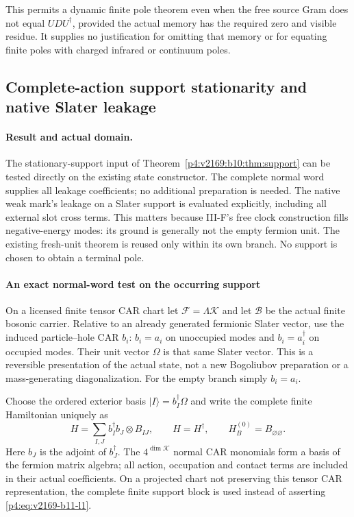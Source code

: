 \documentclass[12pt,a4paper]{article}
\begin{document}
This permits a dynamic finite pole theorem even when the free source Gram
does not equal $UDU^\dagger$, provided the actual memory has the required
zero and visible residue. It supplies no justification for omitting that
memory or for equating finite poles with charged infrared or continuum poles.






\subsection{Complete-action support stationarity and native Slater leakage}
\label{p4:sec:v2169-state-certificate}
\paragraph{Result and actual domain.}
The stationary-support input of Theorem~\ref{p4:v2169:b10:thm:support} can be tested directly on the
existing state constructor. The complete normal word supplies all leakage
coefficients; no additional preparation is needed. The native weak mark's
leakage on a Slater support is evaluated explicitly, including all external
slot cross terms. This matters because III-F's free clock construction fills
negative-energy modes: its ground is generally not the empty fermion unit.
The existing fresh-unit theorem is reused only within its own branch.
No support is chosen to obtain a terminal pole.



\paragraph{An exact normal-word test on the occurring support}
On a licensed finite tensor CAR chart let $\mathcal F=\Lambda\mathcal K$
and let $\mathcal B$ be the actual finite bosonic carrier. Relative to an
already generated fermionic Slater vector, use the induced particle--hole CAR
$b_i$: $b_i=a_i$ on unoccupied modes and $b_i=a_i^\dagger$ on occupied modes.
Their unit vector $\Omega$ is that same Slater vector. This is a reversible
presentation of the actual state, not a new Bogoliubov preparation or a
mass-generating diagonalization. For the empty branch simply $b_i=a_i$.

Choose the ordered exterior basis $|I\rangle=b_I^\dagger\Omega$ and write the
complete finite Hamiltonian uniquely as
\begin{equation}
 H=\sum_{I,J}b_I^\dagger b_J\otimes B_{IJ},\qquad
 H=H^\dagger,\qquad H_B^{(0)}=B_{\varnothing\varnothing}.
 \label{p4:eq:v2169-b11-l1}
\end{equation}
Here $b_J$ is the adjoint of $b_J^\dagger$. The $4^{\dim\mathcal K}$ normal
CAR monomials form a basis of the fermion matrix algebra; all action,
occupation and contact terms are included in their actual coefficients.
On a projected chart not preserving this tensor CAR representation, the
complete finite support block is used instead of asserting \eqref{p4:eq:v2169-b11-l1}.
\end{document}
